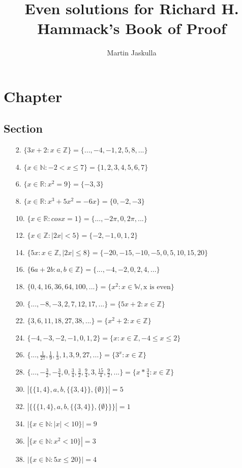 \documentclass{article}
\title{Even solutions for Richard H. Hammack's Book of Proof}
\author{Martin Jaskulla}
\begin{document}
\maketitle
\section{Chapter}
\subsection{Section}

\begin{enumerate}
    \item [2.] $\{3x+2:x \in \mathbb{Z} \} = \{...,-4,-1,2,5,8,...\}$
    \item [4.] $\{x \in \mathbb{N}: -2 < x \leq 7 \} =\{1,2,3,4,5,6,7\}$
    \item [6.] $\{x \in \mathbb{R}: x^2=9 \} =\{-3,3\}$
    \item [8.] $\{x \in \mathbb{R}:x^3+5x^2=-6x \} =\{0,-2,-3\}$
    \item [10.] $\{x \in \mathbb{R}: cos x = 1 \} =\{...,-2\pi,0,2\pi,...\}$
    \item [12.] $\{x \in \mathbb{Z}: |2x|<5 \} =\{-2,-1,0,1,2\}$
    \item [14.] $\{5x: x \in \mathbb{Z}, |2x| \leq8 \} =\{-20,-15,-10,-5,0,5,10,15,20\}$
    \item [16.] $\{6a+2b: a,b \in \mathbb{Z} \} =\{...,-4,-2,0,2,4,...\}$
    \item [18.] $\{0,4,16,36,64,100,...\} = \{x^2: x \in \mathbb{W}, \text{x is even}\}$
    \item [20.] $\{...,-8,-3,2,7,12,17,...\} = \{5x+2: x \in \mathbb{Z}\}$
    \item [22.] $\{3,6,11,18,27,38,...\} = \{x^2+2:x\in \mathbb{Z}\}$
    \item [24.] $\{-4,-3,-2,-1,0,1,2\} = \{ x: x\in \mathbb{Z}, -4 \leq x \leq 2\}$
    \item [26.] $\{...,\frac{1}{27},\frac{1}{9},\frac{1}{3},1,3,9,27,...\} = \{ 3^x: x \in \mathbb{Z}\}$
    \item [28.] $\{...,-\frac{3}{2},-\frac{3}{4},0,\frac{3}{4},\frac{3}{2},\frac{9}{4},3,\frac{15}{4},\frac{9}{2},...\} =\{x * \frac{3}{4}:x \in \mathbb{Z}\}$
    \item [30.] $|\{\{1,4\},a,b,\{\{3,4\}\},\{\emptyset\}\}| = 5$
    \item [32.] $|\{\{\{1,4\},a,b,\{\{3,4\}\},\{\emptyset\}\}\}| = 1$
    \item [34.] $|\{ x \in \mathbb{N}: |x|<10 \}| = 9$
    \item [36.] $|\{ x \in \mathbb{N}: x^2<10 \}| = 3$
    \item [38.] $|\{ x \in \mathbb{N}: 5x \le 20 \}| = 4$
\end{enumerate}
\end{document}
